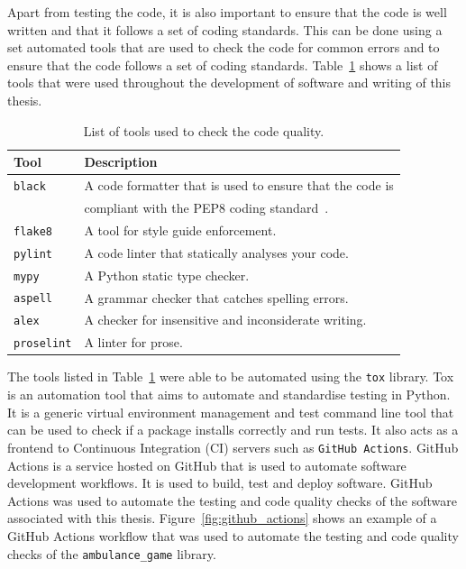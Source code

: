 Apart from testing the code, it is also important to ensure that the code is
well written and that it follows a set of coding standards.
This can be done using a set automated tools that are used to check the code
for common errors and to ensure that the code follows a set of coding standards.
Table~\ref{tab:code_quality_tools} shows a list of tools that were used
throughout the development of software and writing of this thesis.

\begin{table}[H]
    \centering
    \begin{tabular}{|l|l|}
        \hline
        \textbf{Tool} & \textbf{Description} \\
        \hline
        \texttt{black} & A code formatter that is used to ensure that the code
        is \\ & compliant with the PEP8 coding standard~\cite{pep8}. \\
        \hline
        \texttt{flake8} & A tool for style guide enforcement. \\
        \hline
        \texttt{pylint} & A code linter that statically analyses your code. \\
        \hline
        \texttt{mypy} & A Python static type checker. \\
        \hline
        \hline
        \texttt{aspell} & A grammar checker that catches spelling errors. \\
        \hline
        \texttt{alex} & A checker for insensitive and inconsiderate writing. \\
        \hline
        \texttt{proselint} & A linter for prose. \\
        \hline
    \end{tabular}
    \caption{List of tools used to check the code quality.}
    \label{tab:code_quality_tools}
\end{table}

The tools listed in Table~\ref{tab:code_quality_tools} were able to be
automated using the \texttt{tox} library.
Tox is an automation tool that aims to automate and standardise testing in
Python.
It is a generic virtual environment management and test command line tool that
can be used to check if a package installs correctly and run tests.
It also acts as a frontend to Continuous Integration (CI) servers such as
\texttt{GitHub Actions}.
GitHub Actions is a service hosted on GitHub that is used to automate software
development workflows.
It is used to build, test and deploy software.
GitHub Actions was used to automate the testing and code quality checks of the
software associated with this thesis.
Figure~\ref{fig:github_actions} shows an example of a GitHub Actions workflow
that was used to automate the testing and code quality checks of the
\texttt{ambulance\_game} library.

